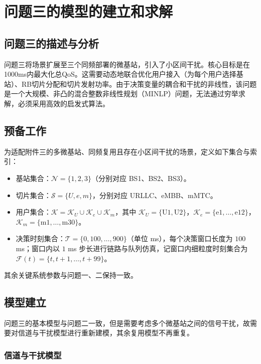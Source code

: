 \section{问题三的模型的建立和求解}
\subsection{问题三的描述与分析}
问题三将场景扩展至三个同频部署的微基站，引入了小区间干扰。核心目标是在1000ms内最大化总QoS。这需要动态地联合优化用户接入（为每个用户选择基站）、RB切片分配和切片发射功率。由于决策变量的耦合和干扰的非线性，该问题是一个大规模、非凸的混合整数非线性规划（MINLP）问题，无法通过穷举求解，必须采用高效的启发式算法。

\subsection{预备工作}


为适配附件三的多微基站、同频复用且存在小区间干扰的场景，定义如下集合与索引：

\begin{itemize}
  \item 基站集合：$\mathcal{N}=\{1,2,3\}$（分别对应 BS1、BS2、BS3）。
  \item 切片集合：$\mathcal{S}=\{U,e,m\}$，分别对应 URLLC、eMBB、mMTC。
  \item 用户集合：$\mathcal{K}=\mathcal{K}_U\cup\mathcal{K}_e\cup\mathcal{K}_m$，其中 $\mathcal{K}_U=\{\mathrm{U1},\mathrm{U2}\}$，$\mathcal{K}_e=\{\mathrm{e1},\dots,\mathrm{e12}\}$，$\mathcal{K}_m=\{\mathrm{m1},\dots,\mathrm{m30}\}$。
  \item 决策时刻集合：$\mathcal{T}=\{0,100,\dots,900\}$（单位 ms），每个决策窗口长度为 $100$ ms；窗口内以 $1$ ms 步长进行链路与队列仿真，记窗口内细粒度时刻集合为 $\mathcal{F}(t)=\{t,t+1,\dots,t+99\}$。
\end{itemize}

其余关键系统参数与问题一、二保持一致。

\subsection{模型建立}
问题三的基本模型与问题二一致，但是需要考虑多个微基站之间的信号干扰，故需要对信道与干扰模型进行重新建模，其余复用模型不再重复。

\subsubsection{信道与干扰模型}

